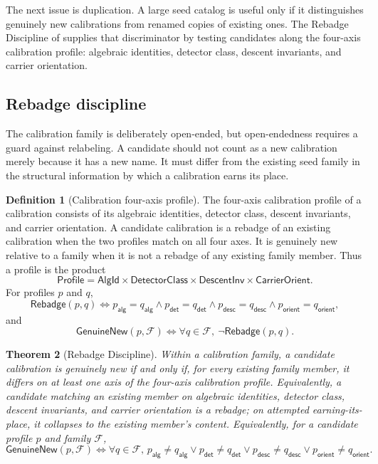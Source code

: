 \documentclass[11pt]{article}
\newcommand{\fourAxis}{four-axis calibration profile}
\newtheorem{theorem}{Theorem}[section]
\theoremstyle{definition}
\newtheorem{definition}[theorem]{Definition}
\begin{document}
The next issue is duplication.  A large seed catalog is useful only if it
distinguishes genuinely new calibrations from renamed copies of existing
ones.  The Rebadge Discipline of  supplies that
discriminator by testing candidates along the \fourAxis{}: algebraic
identities, detector class, descent invariants, and carrier
orientation.

\subsection{Rebadge discipline}\label{sec:calibration:rebadge}

The calibration family is deliberately open-ended, but open-endedness
requires a guard against relabeling.  A candidate should not count as a
new calibration merely because it has a new name.  It must differ from
the existing seed family in the structural information by which a
calibration earns its place.

\begin{definition}[Calibration four-axis profile]\label{def:four-axis-profile}
The \fourAxis{} of a calibration consists of its algebraic identities,
detector class, descent invariants, and carrier orientation.  A candidate
calibration is a rebadge of an existing calibration when the two profiles
match on all four axes.  It is genuinely new relative to a family when it
is not a rebadge of any existing family member.
Thus a profile is the product
\[
  \mathsf{Profile}
  =
  \mathsf{AlgId}\times
  \mathsf{DetectorClass}\times
  \mathsf{DescentInv}\times
  \mathsf{CarrierOrient}.
\]
For profiles \(p\) and \(q\),
\[
  \mathsf{Rebadge}(p,q)
  \iff
  p_{\mathsf{alg}}=q_{\mathsf{alg}}\wedge
  p_{\mathsf{det}}=q_{\mathsf{det}}\wedge
  p_{\mathsf{desc}}=q_{\mathsf{desc}}\wedge
  p_{\mathsf{orient}}=q_{\mathsf{orient}},
\]
and
\[
  \mathsf{GenuineNew}(p,\mathcal F)
  \iff
  \forall q\in\mathcal F,\ \neg\mathsf{Rebadge}(p,q).
\]
\end{definition}

\begin{theorem}[Rebadge Discipline]\label{thm:rebadge-discipline}
Within a calibration family, a candidate calibration is genuinely new if
and only if, for every existing family member, it differs on at least one
axis of the \fourAxis{}.  Equivalently, a candidate matching an existing
member on algebraic identities, detector class, descent invariants, and
carrier orientation is a rebadge; on attempted earning-its-place, it
collapses to the existing member's content.
Equivalently, for a candidate profile \(p\) and family \(\mathcal F\),
\[
  \mathsf{GenuineNew}(p,\mathcal F)
  \iff
  \forall q\in\mathcal F,\,
  p_{\mathsf{alg}}\ne q_{\mathsf{alg}}\vee
  p_{\mathsf{det}}\ne q_{\mathsf{det}}\vee
  p_{\mathsf{desc}}\ne q_{\mathsf{desc}}\vee
  p_{\mathsf{orient}}\ne q_{\mathsf{orient}}.
\]
\end{theorem}
\end{document}
